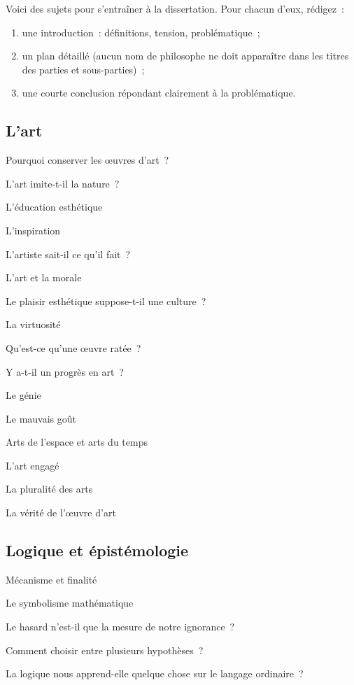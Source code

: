 \documentclass[a4paper]{article}
\begin{document}
Voici des sujets pour s'entraîner à la dissertation. Pour chacun d'eux,
rédigez :

\begin{enumerate}
\item une introduction : définitions, tension, problématique ;

\item un plan détaillé (aucun nom de philosophe ne doit apparaître dans les
titres des parties et sous-parties) ;

\item une courte conclusion répondant clairement à la problématique.
\end{enumerate}

\subsection{L'art}
\label{sec-6-1}

Pourquoi conserver les œuvres d'art ?

L'art imite-t-il la nature ?

L'éducation esthétique

L'inspiration

L'artiste sait-il ce qu'il fait ?

L'art et la morale

Le plaisir esthétique suppose-t-il une culture ?

La virtuosité

Qu'est-ce qu'une œuvre ratée ?

Y a-t-il un progrès en art ?

Le génie

Le mauvais goût

Arts de l'espace et arts du temps

L'art engagé

La pluralité des arts

La vérité de l'œuvre d'art

\subsection{Logique et épistémologie}
\label{sec-6-2}

Mécanisme et finalité

Le symbolisme mathématique

Le hasard n'est-il que la mesure de notre ignorance ?

Comment choisir entre plusieurs hypothèses ?

La logique nous apprend-elle quelque chose sur le langage ordinaire ?
\end{document}
